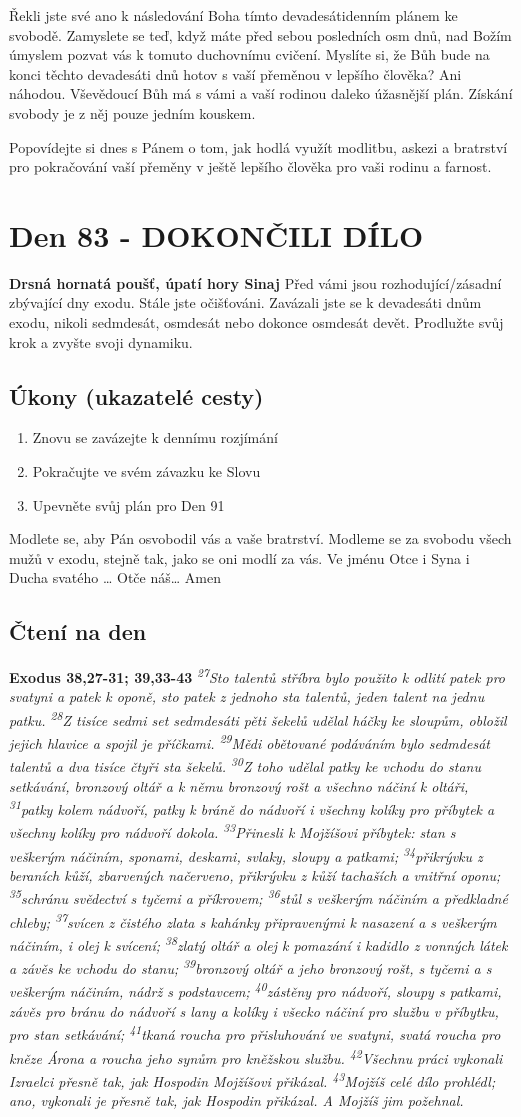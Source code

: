\documentclass[11pt]{article}
\newcommand{\zacatekDvanactyTyden}{
\textbf{Drsná hornatá poušť, úpatí hory Sinaj} \newline 
Před vámi jsou rozhodující/zásadní zbývající dny exodu. Stále jste očišťováni. Zavázali jste se k devadesáti dnům exodu, nikoli sedmdesát, osmdesát nebo dokonce osmdesát devět. Prodlužte svůj krok a zvyšte svoji dynamiku.

\subsection*{Úkony (ukazatelé cesty)}
\begin{enumerate}
  \item Znovu se zavázejte k dennímu rozjímání
  \item Pokračujte ve svém závazku ke Slovu
  \item Upevněte svůj plán pro Den 91
\end{enumerate}
Modlete se, aby Pán osvobodil vás a vaše bratrství. \newline
Modleme se za svobodu všech mužů v exodu, stejně tak, jako se oni modlí za vás.\newline
Ve jménu Otce i Syna i Ducha svatého …  Otče náš… Amen
}
\begin{document}
Řekli jste své ano k následování Boha tímto devadesátidenním plánem ke svobodě. Zamyslete se teď, když máte před
sebou posledních osm dnů, nad Božím úmyslem pozvat vás k tomuto duchovnímu cvičení. Myslíte si, že Bůh bude na
konci těchto devadesáti dnů hotov s vaší přeměnou v lepšího člověka? Ani náhodou. Vševědoucí Bůh má s vámi a vaší
rodinou daleko úžasnější plán. Získání svobody je z něj pouze jedním kouskem.

Popovídejte si dnes s Pánem o tom, jak hodlá využít modlitbu, askezi a bratrství pro pokračování vaší přeměny v ještě
lepšího člověka pro vaši rodinu a farnost.


\newpage
\section{Den 83 - DOKONČILI DÍLO}
\zacatekDvanactyTyden
\subsection*{Čtení na den}
\textbf{Exodus 38,27-31; 39,33-43}
\newline
\textit{
\textsuperscript{27}Sto talentů stříbra bylo použito k odlití patek pro svatyni a patek k oponě, sto patek z jednoho sta talentů, jeden talent na jednu patku.
\textsuperscript{28}Z tisíce sedmi set sedmdesáti pěti šekelů udělal háčky ke sloupům, obložil jejich hlavice a spojil je příčkami.
\textsuperscript{29}Mědi obětované podáváním bylo sedmdesát talentů a dva tisíce čtyři sta šekelů.
\textsuperscript{30}Z toho udělal patky ke vchodu do stanu setkávání, bronzový oltář a k němu bronzový rošt a všechno náčiní k oltáři,
\textsuperscript{31}patky kolem nádvoří, patky k bráně do nádvoří i všechny kolíky pro příbytek a všechny kolíky pro nádvoří dokola.
\newline
\newline
\textsuperscript{33}Přinesli k Mojžíšovi příbytek: stan s veškerým náčiním, sponami, deskami, svlaky, sloupy a patkami;
\textsuperscript{34}přikrývku z beraních kůží, zbarvených načerveno, přikrývku z kůží tachaších a vnitřní oponu;
\textsuperscript{35}schránu svědectví s tyčemi a příkrovem;
\textsuperscript{36}stůl s veškerým náčiním a předkladné chleby;
\textsuperscript{37}svícen z čistého zlata s kahánky připravenými k nasazení a s veškerým náčiním, i olej k svícení;
\textsuperscript{38}zlatý oltář a olej k pomazání i kadidlo z vonných látek a závěs ke vchodu do stanu;
\textsuperscript{39}bronzový oltář a jeho bronzový rošt, s tyčemi a s veškerým náčiním, nádrž s podstavcem;
\textsuperscript{40}zástěny pro nádvoří, sloupy s patkami, závěs pro bránu do nádvoří s lany a kolíky i všecko náčiní pro službu v příbytku, pro stan setkávání;
\textsuperscript{41}tkaná roucha pro přisluhování ve svatyni, svatá roucha pro kněze Árona a roucha jeho synům pro kněžskou službu.
\textsuperscript{42}Všechnu práci vykonali Izraelci přesně tak, jak Hospodin Mojžíšovi přikázal.
\textsuperscript{43}Mojžíš celé dílo prohlédl; ano, vykonali je přesně tak, jak Hospodin přikázal. A Mojžíš jim požehnal.
}
\end{document}
